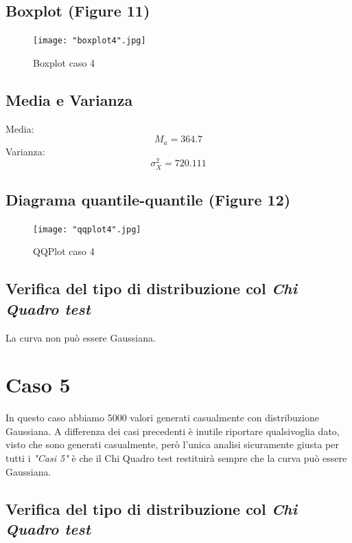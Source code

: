 \documentclass[a4paper]{article}
\begin{document}
\subsection{Boxplot (Figure 11)}
\begin{figure}[htp]
	\centering
	\texttt{[image: "boxplot4".jpg]}
	\caption{Boxplot caso 4}
	\label{}
\end{figure}

\subsection{Media e Varianza}
Media: 
\begin{equation}
	M_{a} = 364.7
\end{equation}
Varianza: 
\begin{equation}
	\sigma _{X}^{2} = 720.111
\end{equation}

\subsection{Diagrama quantile-quantile (Figure 12)}
\begin{figure}[htp]
	\centering
	\texttt{[image: "qqplot4".jpg]}
	\caption{QQPlot caso 4}
	\label{}
\end{figure}

\subsection{Verifica del tipo di distribuzione col \emph{Chi Quadro test}}

La curva non può essere Gaussiana.



\section{Caso 5}
In questo caso abbiamo 5000 valori generati casualmente con distribuzione Gaussiana.
A differenza dei casi precedenti è inutile riportare qualsivoglia dato, visto che sono generati casualmente, però l'unica analisi sicuramente giusta per tutti i \emph{"Casi 5"} è che il Chi Quadro test restituirà sempre che la curva può essere Gaussiana.
\\



\subsection{Verifica del tipo di distribuzione col \emph{Chi Quadro test}}
\end{document}
